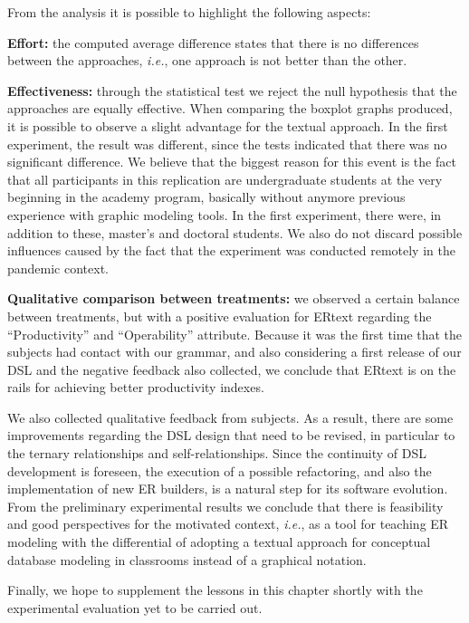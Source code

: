 From the analysis it is possible to highlight the following aspects:

\item \textbf{Effort:} the computed average difference states that there is no differences between the approaches, \textit{i.e.}, one approach is not better than the other. 
\item \textbf{Effectiveness:} through the statistical test we reject the null hypothesis that the approaches are equally effective. 
When comparing the boxplot graphs produced, it is possible to observe a slight advantage for the textual approach. 
In the first experiment, the result was different, since the tests indicated that there was no significant difference. 
We believe that the biggest reason for this event is the fact that all participants in this replication are undergraduate students at the very beginning in the academy program, basically without anymore previous experience with graphic modeling tools. 
In the first experiment, there were, in addition to these, master's and doctoral students. 
We also do not discard possible influences caused by the fact that the experiment was conducted remotely in the pandemic context.
\item \textbf{Qualitative comparison between treatments:} we observed a certain balance between treatments, but with a positive evaluation for ERtext regarding the ``Productivity'' and ``Operability'' attribute.
Because it was the first time that the subjects had contact with our grammar, and also considering a first release of our DSL and the negative feedback also collected, we conclude that ERtext is on the rails for achieving better productivity indexes.


We also collected qualitative feedback from subjects. 
As a result, there are some improvements regarding the DSL design that need to be revised, in particular to the ternary relationships and self-relationships.
Since the continuity of DSL development is foreseen, the execution of a possible refactoring, and also the implementation of new ER builders, is a natural step for its software evolution.
From the preliminary experimental results we conclude that there is feasibility and good perspectives for the motivated context, \textit{i.e.}, as a tool for teaching ER modeling with the differential of adopting a textual approach for conceptual database modeling in classrooms instead of a graphical notation.

Finally, we hope to supplement the lessons in this chapter shortly with the experimental evaluation yet to be carried out.



